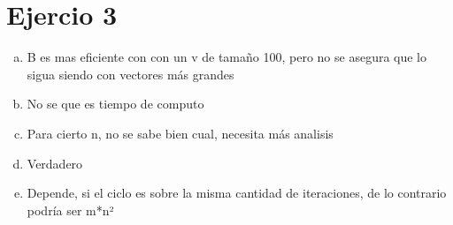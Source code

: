 \documentclass{article}
\begin{document}
\section*{Ejercio 3}

\begin{enumerate}[a)]
    \item B es mas eficiente con con un v de tamaño 100, pero no se asegura que lo sigua siendo con vectores más grandes
    \item No se que es tiempo de computo
    \item Para cierto n, no se sabe bien cual, necesita más analisis
    \item Verdadero
    \item Depende, si el ciclo es sobre la misma cantidad de iteraciones,    de lo contrario podría ser m*n²
\end{enumerate}
\end{document}
